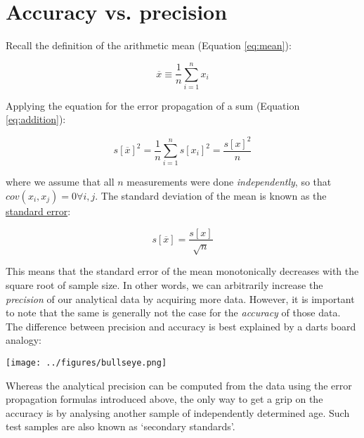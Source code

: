 \section{Accuracy vs. precision}

Recall the definition of the arithmetic mean (Equation \ref{eq:mean}):

$$\overline{x} \equiv \frac{1}{n} \sum_{i=1}^{n} x_i$$

Applying the equation for the error propagation of a sum (Equation
\ref{eq:addition}):

\begin{equation}
s[\overline{x}]^2 = \frac{1}{n} \sum_{i=1}^{n} s[x_i]^2 =
\frac{s[x]^2}{n}
\label{eq:varianceofthemean}
\end{equation}

where we assume that all $n$ measurements were done
\emph{independently}, so that $cov(x_i,x_j)=0 \forall i, j$.  The
standard deviation of the mean is known as the \underline{standard
  error}:

\begin{equation}
s[\overline{x}] = \frac{s[x]}{\sqrt{n}}
\label{eq:standarderror}
\end{equation}

This means that the standard error of the mean monotonically decreases
with the square root of sample size. In other words, we can
arbitrarily increase the \emph{precision} of our analytical data by
acquiring more data. However, it is important to note that the same is
generally not the case for the \emph{accuracy} of those data. The
difference between precision and accuracy is best explained by a darts
board analogy:\\

\noindent
\begin{minipage}{\textwidth}
  \centering
  \ifpdf
  \def\svgwidth{\textwidth}
  
  \else
  \texttt{[image: ../figures/bullseye.png]}
  \fi
\end{minipage}

\bigskip

Whereas the analytical precision can be computed from the data using
the error propagation formulas introduced above, the only way to get a
grip on the accuracy is by analysing another sample of independently
determined age. Such test samples are also known as `secondary
standards'.

